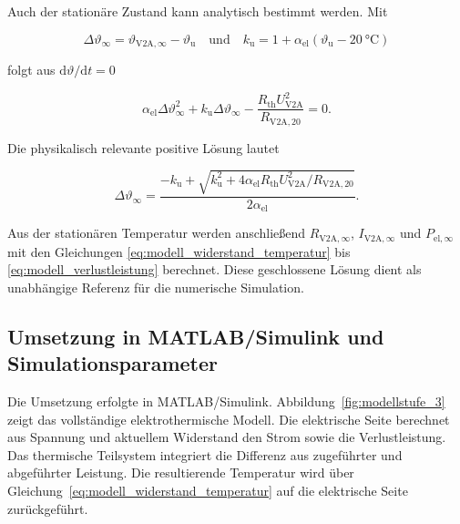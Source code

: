 Auch der stationäre Zustand kann analytisch bestimmt werden. Mit

\begin{equation}
    \Delta\vartheta_{\infty}
    =\vartheta_{\mathrm{V2A},\infty}-\vartheta_{\mathrm{u}}
    \quad\text{und}\quad
    k_{\mathrm{u}}
    =1+\alpha_{\mathrm{el}}
      \left(\vartheta_{\mathrm{u}}-\SI{20}{\degreeCelsius}\right)
    \label{eq:modell_stationaere_hilfsgroessen}
\end{equation}

folgt aus \(\mathrm{d}\vartheta/\mathrm{d}t=0\)

\begin{equation}
    \alpha_{\mathrm{el}}\Delta\vartheta_{\infty}^{2}
    +k_{\mathrm{u}}\Delta\vartheta_{\infty}
    -\frac{R_{\mathrm{th}}U_{\mathrm{V2A}}^{2}}
          {R_{\mathrm{V2A},20}}
    =0.
    \label{eq:modell_stationaere_quadratik}
\end{equation}

Die physikalisch relevante positive Lösung lautet

\begin{equation}
    \Delta\vartheta_{\infty}
    =
    \frac{
        -k_{\mathrm{u}}
        +\sqrt{
            k_{\mathrm{u}}^{2}
            +4\alpha_{\mathrm{el}}
             R_{\mathrm{th}}U_{\mathrm{V2A}}^{2}/R_{\mathrm{V2A},20}
        }
    }
    {2\alpha_{\mathrm{el}}}.
    \label{eq:modell_stationaere_temperatur}
\end{equation}

Aus der stationären Temperatur werden anschließend
\(R_{\mathrm{V2A},\infty}\), \(I_{\mathrm{V2A},\infty}\) und
\(P_{\mathrm{el},\infty}\) mit den Gleichungen
\eqref{eq:modell_widerstand_temperatur} bis
\eqref{eq:modell_verlustleistung} berechnet. Diese geschlossene Lösung dient
als unabhängige Referenz für die numerische Simulation.


\subsection{Umsetzung in MATLAB/Simulink und Simulationsparameter}
\label{sec:umsetzung_simulationsparameter}

Die Umsetzung erfolgte in MATLAB/Simulink. Abbildung~\ref{fig:modellstufe_3}
zeigt das vollständige elektrothermische Modell. Die elektrische Seite
berechnet aus Spannung und aktuellem Widerstand den Strom sowie die
Verlustleistung. Das thermische Teilsystem integriert die Differenz aus
zugeführter und abgeführter Leistung. Die resultierende Temperatur wird über
Gleichung~\eqref{eq:modell_widerstand_temperatur} auf die elektrische Seite
zurückgeführt.

